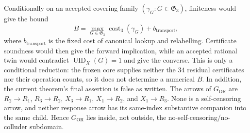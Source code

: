 Conditionally on an accepted covering family \((\gamma_G:G\in\mathfrak G_3)\), finiteness would give the bound
\[
B=\max_{G\in\mathfrak G_3}\operatorname{cost}_3(\gamma_G)+b_{\mathrm{transport}},
\]
where \(b_{\mathrm{transport}}\) is the fixed cost of canonical lookup and relabelling.  Certificate soundness would then give the forward implication, while an accepted rational twin would contradict \(\operatorname{UID}_X(G)=1\) and give the converse.  This is only a conditional reduction: the frozen core supplies neither the \(34\) residual certificates nor their operation counts, so it does not determine a numerical \(B\).  In addition, the current theorem's final assertion is false as written.  The arrows of \(G_{\mathrm{OR}}\) are \(R_2\to R_1\), \(R_3\to R_2\), \(X_3\to R_1\), \(X_1\to R_2\), and \(X_1\to R_3\).  None is a self-censoring arrow, and neither response arrow has its same-index substantive companion into the same child.  Hence \(G_{\mathrm{OR}}\) lies inside, not outside, the no-self-censoring/no-colluder subdomain.